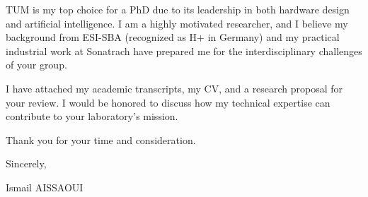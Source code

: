 \documentclass[11pt,a4paper]{article}
\begin{document}
TUM is my top choice for a PhD due to its leadership in both hardware design and artificial intelligence. I am a highly motivated researcher, and I believe my background from ESI-SBA (recognized as H+ in Germany) and my practical industrial work at Sonatrach have prepared me for the interdisciplinary challenges of your group.

I have attached my academic transcripts, my CV, and a research proposal for your review. I would be honored to discuss how my technical expertise can contribute to your laboratory’s mission.

Thank you for your time and consideration.

Sincerely,

\bigskip

\noindent Ismail AISSAOUI
\end{document}
